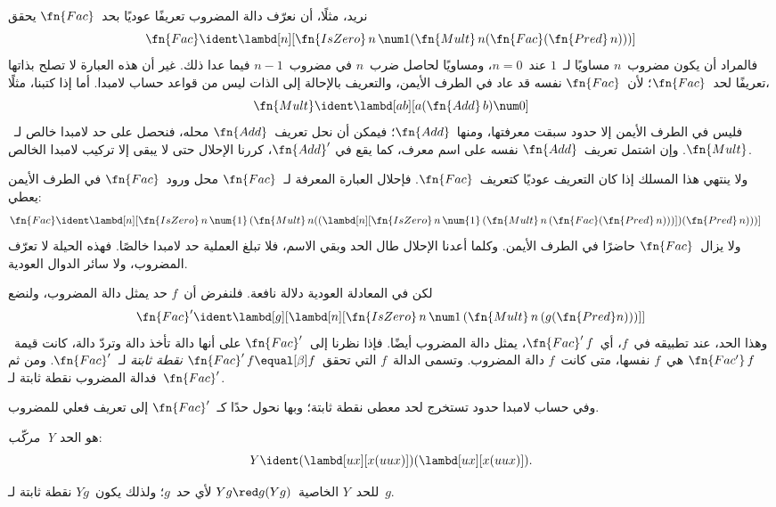 \documentclass[../../../include/open-logic-section]{subfiles}
\begin{document}


نريد، مثلًا، أن نعرّف دالة المضروب تعريفًا عوديًا بحد~$\fn{Fac}$
يحقق
\[
\fn{Fac} \ident \lambd[n][\fn{IsZero}\, n\, \num 1 (\fn{Mult}\, n (\fn{Fac}(\fn{Pred} \, n)))]
\]
فالمراد أن يكون مضروب~$n$ مساويًا لـ~$1$ عند~$n = 0$، ومساويًا
لحاصل ضرب~$n$ في مضروب~$n-1$ فيما عدا ذلك. غير أن هذه العبارة لا
تصلح بذاتها تعريفًا لحد~$\fn{Fac}$؛ لأن~$\fn{Fac}$ نفسه قد عاد
في الطرف الأيمن، والتعريف بالإحالة إلى الذات ليس من قواعد حساب لامبدا.
أما إذا كتبنا، مثلًا،
\[
\fn{Mult} \ident \lambd[ab][a (\fn{Add}\, b) \num 0]
\]
فليس في الطرف الأيمن إلا حدود سبقت معرفتها، ومنها~$\fn{Add}$؛ فيمكن
أن نحل تعريف~$\fn{Add}$ محله، فنحصل على حد لامبدا خالص لـ~$\fn{Mult}$.
وإن اشتمل تعريف~$\fn{Add}$ نفسه على اسم معرف، كما يقع في
$\fn{Add}'$، كررنا الإحلال حتى لا يبقى إلا تركيب لامبدا الخالص.

ولا ينتهي هذا المسلك إذا كان التعريف عوديًا كتعريف~$\fn{Fac}$.
فإحلال العبارة المعرفة لـ~$\fn{Fac}$ محل ورود~$\fn{Fac}$ في الطرف الأيمن
يعطي:
\begin{align*}
  \fn{Fac} & \ident
  \lambd[n][\fn{IsZero}\, n\, \num{1}\,
    (\fn{Mult}\, n
      ((\lambd[n][\fn{IsZero}\, n\, \num{1}\,
        (\fn{Mult}\, n\, (\fn{Fac}(\fn{Pred}\, n)))])
      (\fn{Pred}\, n)))]
\end{align*}
ولا يزال~$\fn{Fac}$ حاضرًا في الطرف الأيمن. وكلما أعدنا الإحلال طال
الحد وبقي الاسم، فلا تبلغ العملية حد لامبدا خالصًا. فهذه الحيلة لا
تعرّف المضروب، ولا سائر الدوال العودية.

لكن في المعادلة العودية دلالة نافعة. فلنفرض أن~$f$ حد يمثل دالة
المضروب، ولنضع
\[
\fn{Fac}' \ident \lambd[g][\lambd[n][\fn{IsZero} \, n \, \num 1\, (\fn{Mult} \, n\, (g (\fn{Pred} n)))]]
\]
وهذا الحد، عند تطبيقه في~$f$، أي~$\fn{Fac}'\,f$، يمثل دالة المضروب
أيضًا. فإذا نظرنا إلى~$\fn{Fac}'$ على أنها دالة تأخذ دالة وتردّ
دالة، كانت قيمة~$\fn{Fac'}\, f$ هي~$f$ نفسها، متى كانت~$f$ دالة
المضروب. وتسمى الدالة~$f$ التي تحقق~$\fn{Fac}' \, f \equal[\beta] f$
\emph{نقطة ثابتة} لـ~$\fn{Fac}'$. ومن ثم فدالة المضروب نقطة ثابتة
لـ~$\fn{Fac}'$.

وفي حساب لامبدا حدود تستخرج لحد معطى نقطة ثابتة؛ وبها نحول حدًا
كـ~$\fn{Fac}'$ إلى تعريف فعلي للمضروب.

\begin{defn}
  \emph{مركّب~Y} هو الحد:
  \[
  Y \ident (\lambd[ux][x(uux)])(\lambd[ux][x(uux)]).
  \]
\end{defn}

\begin{thm}
  للحد~$Y$ الخاصية~$Yg \red g(Yg)$ لأي حد~$g$؛ ولذلك يكون~$Yg$
  نقطة ثابتة لـ~$g$.
\end{thm}
\end{document}
